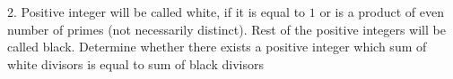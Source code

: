 2. Positive integer will be called white, if it is equal to $1$ or is a product of even number of primes (not necessarily distinct). Rest of the positive integers will be called black. Determine whether there exists a positive integer which sum of white divisors is equal to sum of black divisors